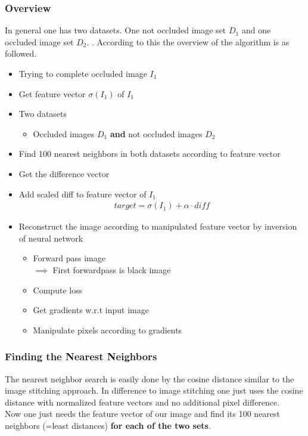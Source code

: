 \documentclass[
     11pt,         %
     a4paper,      %
     oneside,
     ]{article}
\begin{document}
\subsubsection{Overview}
In general one has two datasets. One not occluded image set $D_1$ and one occluded image set $D_2$.
. According to this the overview of the algorithm is as followed.
\begin{itemize}
	\item Trying to complete occluded image $I_1$
	\item Get feature vector $\sigma (I_1)$ of $I_1$
	\item Two datasets
    \begin{itemize}
        \item Occluded images $D_1$ \textbf{and} not occluded images $D_2$
    \end{itemize}
    \item Find 100 nearest neighbors in both datasets according to feature vector
    \item Get the difference vector
    \item Add scaled diff to feature vector of $I_1$
    \begin{align*}
    	target = \sigma (I_1) + \alpha \cdot diff
    \end{align*}
    \item Reconstruct the image according to manipulated feature vector by inversion of neural network
    \begin{itemize}
        \item Forward pass image \\
        $\implies$ First forwardpass is black image
        \item Compute loss
        \item Get gradients w.r.t input image
        \item Manipulate pixels according to gradients
    \end{itemize}
\end{itemize}


\subsubsection{Finding the Nearest Neighbors}
The nearest neighbor search is easily done by the cosine distance similar to the image stitching approach.
In difference to image stitching one just uses the cosine distance with normalized feature vectors and no additional pixel difference.\\
Now one just needs the feature vector of our image and find its 100 nearest neighbors (=least distances) \textbf{for each of the two sets}.
\end{document}
